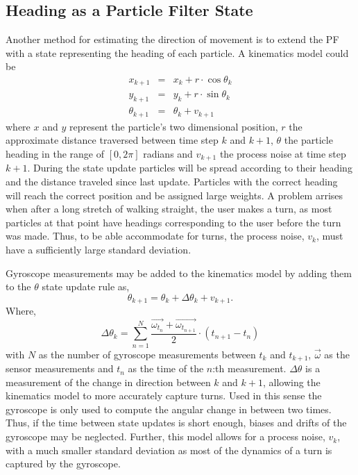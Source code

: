 \documentclass{LTHthesis}
\begin{document}
\subsection{Heading as a Particle Filter State}
\label{subsec:PF_heading}
%
Another method for estimating the direction of movement is to extend the PF with a state representing the heading of each particle. A kinematics model could be
%
\begin{eqnarray}
x_{k+1} &  = & x_k + r\cdot\cos{\theta_k} \nonumber\\
y_{k+1} & = &y_k + r\cdot\sin{\theta_k}\label{eq:heading_kin_mod}\\
\theta_{k+1} & = & \theta_k + v_{k+1} \nonumber
\end{eqnarray}
%
where $x$ and $y$ represent the particle's two dimensional position, $r$ the approximate distance traversed between time step $k$ and $k+1$, $\theta$ the particle heading in the range of $\left[0,2\pi\right]$ radians and $v_{k+1}$ the process noise at time step $k+1$. During the state update particles will be spread according to their heading and the distance traveled since last update. Particles with the correct heading will reach the correct position and be assigned large weights. A problem arrises when after a long stretch of walking straight, the user makes a turn, as most particles at that point have headings corresponding to the user before the turn was made. Thus, to be able accommodate for turns, the process noise, $v_k$, must have a sufficiently large standard deviation. 

Gyroscope measurements may be added to the kinematics model by adding them to the $\theta$ state update rule as,
%
\begin{equation}
\theta_{k+1} = \theta_k + \Delta\theta_k + v_{k+1}.\label{eq:heading_gyro}
\end{equation} 
%
Where,
%
\begin{equation}
\Delta\theta_k = \sum^N_{n=1}\frac{\vec{\omega_{t_n}}+\vec{\omega_{t_{n+1}}}}{2}\cdot\left(t_{n+1}-t_n\right)
\end{equation}
%
with $N$ as the number of gyroscope measurements between $t_k$ and $t_{k+1}$, $\vec{\omega}$ as the sensor measurements and $t_n$ as the time of the $n$:th measurement. $\Delta\theta$ is a measurement of the change in direction between $k$ and $k+1$, allowing the kinematics model to more accurately capture turns. Used in this sense the gyroscope is only used to compute the angular change in between two times. Thus, if the time between state updates is short enough, biases and drifts of the gyroscope may be neglected. Further, this model allows for a process noise, $v_k$, with a much smaller standard deviation as most of the dynamics of a turn is captured by the gyroscope. 
\end{document}
